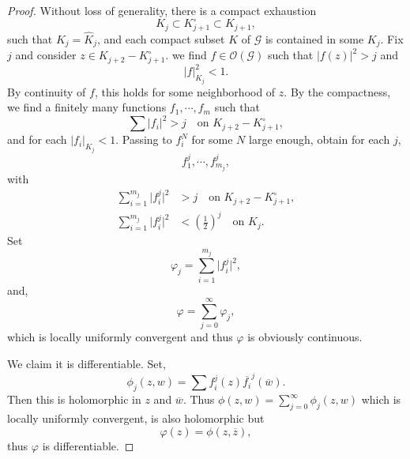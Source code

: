 \documentclass{article}
\newcommand{\G}[0]{\mathcal{G}}
\newcommand{\Ouv}[0]{\mathcal{O}}
\begin{document}
\begin{proof}
  Without loss of generality, there is a compact exhaustion 
  \begin{equation*}
    K_j\subset K_{j+1}^\circ\subset K_{j+1},
  \end{equation*}
  such that $K_j=\hat{K}_j$, and each compact subset $K$ of $\G$ is contained in some $K_j$.
  Fix $j$ and consider $z\in K_{j+2}-K_{j+1}^\circ$. we find $f\in\Ouv(\G)$ such that $\vert f(z)\vert^2>j$ and 
  \begin{equation*}
    \vert f\vert_{K_j}^2<1.
  \end{equation*}
  By continuity of $f$, this holds for some neighborhood of $z$. By the compactness, we find a finitely many functions $f_1,\cdots,f_m$ such that 
  \begin{equation*}
    \sum \vert f_i\vert^2 >j \quad\text{on $K_{j+2}-K_{j+1}^\circ$},
  \end{equation*}
  and for each $\vert f_i\vert_{K_j}< 1$. Passing to $f_i^N$ for some $N$ large enough, obtain for each $j$, 
  \begin{equation*}
    f_1^j,\cdots,f_{m_j}^j,
  \end{equation*}
  with 
  \begin{align*}
    \sum_{i=1}^{m_j}\vert f_i^j\vert^2 &>j\quad\text{on $K_{j+2}-K_{j+1}^\circ$},\\
    \sum_{i=1}^{m_j}\vert f_i^j\vert^2&<\left({\frac 1 2}\right)^j\quad\text{on $K_{j}$}.
  \end{align*}
  Set 
  \begin{equation*}
    \varphi_j = \sum_{i=1}^{m_j}\vert f_i^j\vert^2,
  \end{equation*}
  and,
  \begin{equation*}
    \varphi = \sum_{j=0}^\infty \varphi_j,
  \end{equation*}
  which is locally uniformly convergent and thus $\varphi$ is obviously continuous.
  \par We claim it is differentiable. Set,
  \begin{equation*}
    \phi_j(z,w) = \sum f_i^j(z)\overline{f_i}^j(\overline{w}).
  \end{equation*}
  Then this is holomorphic in $z$ and $\overline{w}$. Thus $\phi(z,w)=\sum_{j=0}^\infty\phi_j(z,w)$ which is locally uniformly convergent, is also holomorphic but 
  \begin{equation*}
    \varphi(z) = \phi(z,\overline{z}),
  \end{equation*}
  thus $\varphi$ is differentiable.
\end{proof}
\end{document}
